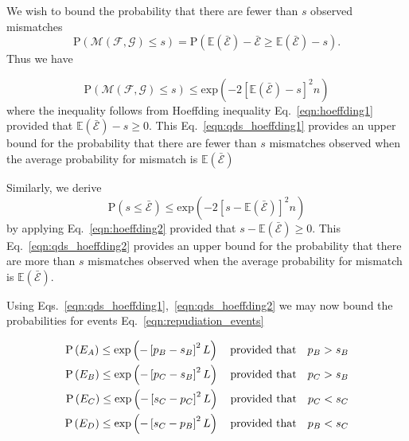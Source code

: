 We wish to bound the probability that there are fewer than $s$ observed mismatches
\begin{equation}
\text{P}\left(\mathcal{M}\left(\mathcal{F}, \mathcal{G}\right) \le s\right) = \text{P}\left( \mathbb{E}\left(\bar{\mathcal{E}}\right) - \bar{\mathcal{E}} \ge \mathbb{E}\left(\bar{\mathcal{E}}\right) - s\right).
\end{equation}
Thus we have

\begin{equation}\label{eqn:qds_hoeffding1}
\text{P}\left(\mathcal{M}\left(\mathcal{F}, \mathcal{G}\right) \le s \right) \le \text{exp}\left(- 2 \left[\mathbb{E}\left(\bar{\mathcal{E}}\right) - s\right]^2 n \right)
\end{equation}
where the inequality follows from Hoeffding inequality Eq.~\ref{eqn:hoeffding1} provided that $\mathbb{E}\left(\bar{\mathcal{E}}\right) - s \ge 0$. This Eq.~\ref{eqn:qds_hoeffding1} provides an upper bound for the probability that there are fewer than $s$ mismatches observed when the average probability for mismatch is $\mathbb{E}\left(\bar{\mathcal{E}}\right)$

Similarly, we derive
\begin{equation}\label{eqn:qds_hoeffding2}
\text{P}\left(s \le \bar{\mathcal{E}}\right) \le \text{exp}\left( - 2 \left[s - \mathbb{E}\left(\bar{\mathcal{E}}\right)\right]^2 n\right)
\end{equation}
by applying Eq.~\ref{eqn:hoeffding2} provided that $s - \mathbb{E}\left(\bar{\mathcal{E}}\right) \ge 0$. This Eq.~\ref{eqn:qds_hoeffding2} provides an upper bound for the probability that there are more than $s$ mismatches observed when the average probability for mismatch is $\mathbb{E}\left(\bar{\mathcal{E}}\right)$. 


Using Eqs.~\ref{eqn:qds_hoeffding1},~\ref{eqn:qds_hoeffding2} we may now bound the probabilities for events Eq.~\ref{eqn:repudiation_events}

\begin{align}\label{eqn:qds_repudiation_events_probs}
\text{P}\left(E_A\right) \le \text{exp}\left( -\left[p_B - s_B\right]^2 L \right) \qq{provided that} p_B > s_B \notag \\
\text{P}\left(E_B\right) \le \text{exp}\left( -\left[p_C - s_B\right]^2 L \right) \qq{provided that} p_C > s_B \notag \\
\text{P}\left(E_C\right) \le \text{exp}\left( -\left[s_C - p_C\right]^2 L \right) \qq{provided that} p_C < s_C \notag \\
\text{P}\left(E_D\right) \le \text{exp}\left( -\left[s_C - p_B\right]^2 L \right) \qq{provided that} p_B < s_C
\end{align}

